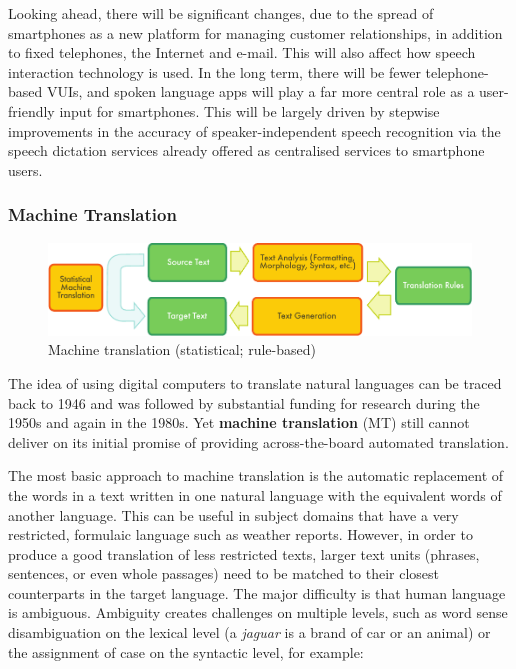 \documentclass[]{../../metanetpaper}
\begin{document}
\begin{multicols}{2}
Looking ahead, there will be significant changes, due to the spread of smartphones as a new platform for managing customer relationships, in addition to fixed telephones, the Internet and e-mail. This will also affect how speech interaction technology is used. In the long term, there will be fewer telephone-based VUIs, and spoken language apps will play a far more central role as a user-friendly input for smartphones. This will be largely driven by stepwise improvements in the accuracy of speaker-independent speech recognition via the speech dictation services already offered as centralised services to smartphone users.

\subsubsection{Machine Translation}

\begin{figure}[htb]
  \center
  \includegraphics[width=\textwidth]{../_media/english/machine_translation}
  \caption{Machine translation (statistical; rule-based)}
  \label{fig:mtarch_en}
\end{figure}

The idea of using digital computers to translate natural languages can be traced back to 1946 and was followed by substantial funding for research during the 1950s and again in the 1980s. 
Yet \textbf{machine translation} (MT) still cannot deliver on its initial promise of providing across-the-board automated translation.  


The most basic approach to machine translation is the automatic replacement of the words in a text written in one natural language with the equivalent words of another language. This can be useful in subject domains that have a very restricted, formulaic language such as weather reports.
However, in order to produce a good translation of less restricted texts, larger text units (phrases, sentences, or even whole passages) need to be matched to their closest counterparts in the target language. The major difficulty is that human language is ambiguous. Ambiguity creates challenges on multiple levels, such as word sense disambiguation on the lexical level (a \textit{jaguar} is a brand of car or an animal) or the assignment of case on the syntactic level, for example:


\end{multicols}
\end{document}
